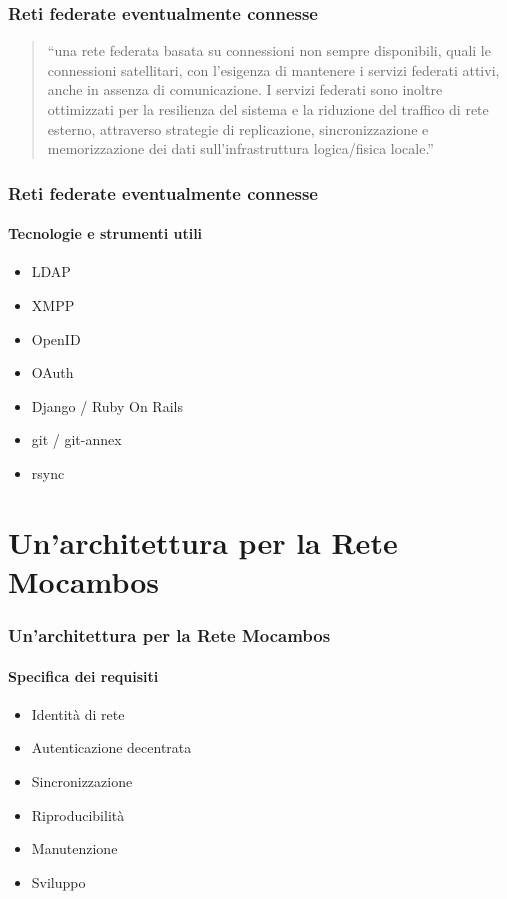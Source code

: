 \documentclass{beamer}
\begin{document}
\begin{frame}
  \frametitle{Reti federate eventualmente connesse}
  \begin{quote}
    ``una rete federata basata su connessioni non sempre disponibili,
    quali le connessioni satellitari, con l'esigenza di mantenere i
    servizi federati attivi, anche in assenza di comunicazione. I
    servizi federati sono inoltre ottimizzati per la resilienza del
    sistema e la riduzione del traffico di rete esterno, attraverso
    strategie di replicazione, sincronizzazione e memorizzazione dei
    dati sull'infrastruttura logica/fisica locale.''
    \end{quote}
\end{frame}


{
\begin{frame}
  \frametitle{Reti federate eventualmente connesse}
  \framesubtitle{Tecnologie e strumenti utili}
  \begin{itemize}
    \item LDAP
    \item XMPP
    \item OpenID
    \item OAuth
    \item Django / Ruby On Rails
    \item git / git-annex
    \item rsync
    \end{itemize}
\end{frame}
}


\section{Un'architettura per la Rete Mocambos}

\begin{frame}
  \frametitle{Un'architettura per la Rete Mocambos}
  \framesubtitle{Specifica dei requisiti}
  \begin{itemize}
    \item Identità di rete
    \item Autenticazione decentrata
    \item Sincronizzazione
    \item Riproducibilità
    \item Manutenzione
    \item Sviluppo
    \end{itemize}

\end{frame}
\end{document}

